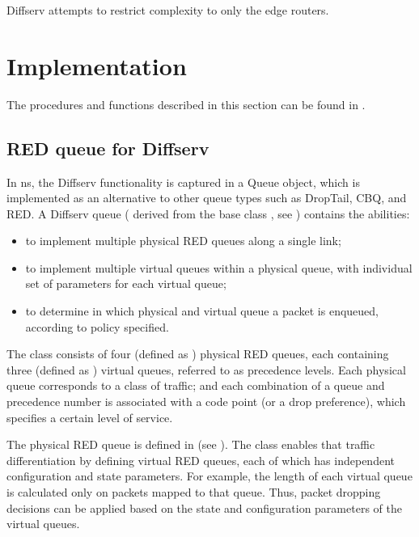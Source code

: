 Diffserv attempts to restrict complexity to only the edge routers.


\section{Implementation}
\label{sec:diffservimplement}

The procedures and functions described in this section can be found in
.

\subsection{RED queue for Diffserv}
\label{sec:dsredq}

In ns, the Diffserv functionality is captured in a Queue object, which is 
implemented as an alternative to other queue types such as DropTail, CBQ, and 
RED.  A Diffserv queue ( derived from the base class 
, see ) contains the abilities:

\begin{itemize}
\item
to implement multiple physical RED queues along a single link;
\item
to implement multiple virtual queues within a physical queue, with 
individual set of parameters for each virtual queue;
\item
to determine in which physical and virtual queue a packet is enqueued, according
to policy specified.
\end{itemize}

The class  consists of four (defined as ) 
physical RED queues,
each containing three (defined as ) virtual queues, 
referred to as precedence levels. Each physical queue corresponds to a class of
traffic; and each combination of a queue and precedence number is associated 
with a code point (or a drop preference), which specifies a certain level of 
service.

The physical RED queue is defined in  
(see ). 
The  class enables that traffic differentiation by defining 
virtual RED queues, each of which has independent configuration and state 
parameters. 
For example, the length of each virtual queue is calculated only on packets 
mapped to that queue.  Thus, packet dropping decisions can be applied based on 
the state and configuration parameters of the virtual queues.

